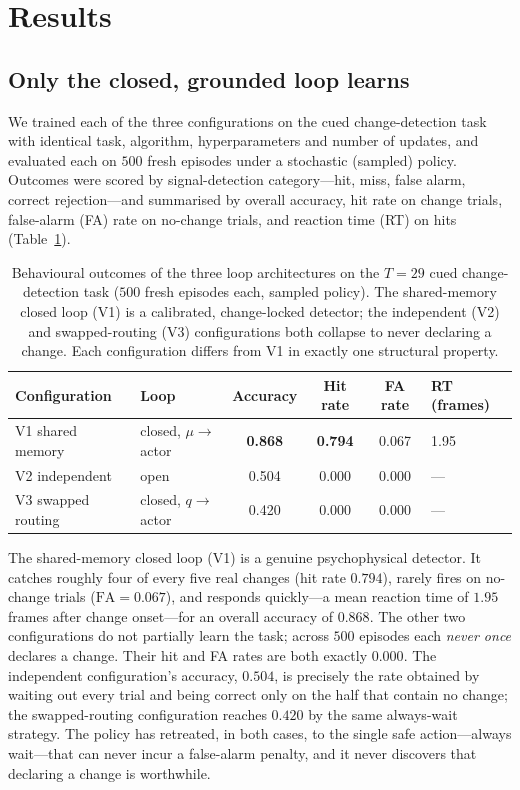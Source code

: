 \section{Results}
\label{sec:results}

\subsection{Only the closed, grounded loop learns}
We trained each of the three configurations on the cued change-detection task with identical task, algorithm, hyperparameters and number of updates, and evaluated each on $500$ fresh episodes under a stochastic (sampled) policy. Outcomes were scored by signal-detection category---hit, miss, false alarm, correct rejection---and summarised by overall accuracy, hit rate on change trials, false-alarm (FA) rate on no-change trials, and reaction time (RT) on hits (Table~\ref{tab:loopresults}).

\begin{table}[t]
\centering
\caption{Behavioural outcomes of the three loop architectures on the $T=29$ cued change-detection task ($500$ fresh episodes each, sampled policy). The shared-memory closed loop (V1) is a calibrated, change-locked detector; the independent (V2) and swapped-routing (V3) configurations both collapse to never declaring a change. Each configuration differs from V1 in exactly one structural property.}
\label{tab:loopresults}
\small
\begin{tabular}{llcccl}
\toprule
Configuration & Loop & Accuracy & Hit rate & FA rate & RT (frames) \\
\midrule
V1 shared memory & closed, $\mu\!\to$\,actor & \textbf{0.868} & \textbf{0.794} & 0.067 & 1.95 \\
V2 independent & open & 0.504 & 0.000 & 0.000 & --- \\
V3 swapped routing & closed, $q\!\to$\,actor & 0.420 & 0.000 & 0.000 & --- \\
\bottomrule
\end{tabular}
\end{table}

The shared-memory closed loop (V1) is a genuine psychophysical detector. It catches roughly four of every five real changes (hit rate $0.794$), rarely fires on no-change trials ($\mathrm{FA}=0.067$), and responds quickly---a mean reaction time of $1.95$ frames after change onset---for an overall accuracy of $0.868$. The other two configurations do not partially learn the task; across $500$ episodes each \emph{never once} declares a change. Their hit and FA rates are both exactly $0.000$. The independent configuration's accuracy, $0.504$, is precisely the rate obtained by waiting out every trial and being correct only on the half that contain no change; the swapped-routing configuration reaches $0.420$ by the same always-wait strategy. The policy has retreated, in both cases, to the single safe action---always wait---that can never incur a false-alarm penalty, and it never discovers that declaring a change is worthwhile.

